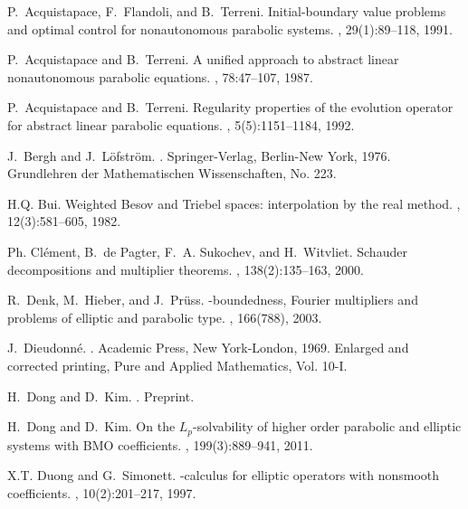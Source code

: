 \documentclass{amsart}
\theoremstyle{plain}
\theoremstyle{remark}
\theoremstyle{plain}
\numberwithin{equation}{section}
\begin{document}
\begin{thebibliography}{10}

P.~Acquistapace, F.~Flandoli, and B.~Terreni.
\newblock Initial-boundary value problems and optimal control for nonautonomous
  parabolic systems.
, 29(1):89--118, 1991.

P.~Acquistapace and B.~Terreni.
\newblock A unified approach to abstract linear nonautonomous parabolic
  equations.
, 78:47--107, 1987.

P.~Acquistapace and B.~Terreni.
\newblock Regularity properties of the evolution operator for abstract linear
  parabolic equations.
, 5(5):1151--1184, 1992.

J.~Bergh and J.~L{\"o}fstr{\"o}m.
.
\newblock Springer-Verlag, Berlin-New York, 1976.
\newblock Grundlehren der Mathematischen Wissenschaften, No. 223.

H.Q. Bui.
\newblock Weighted {B}esov and {T}riebel spaces: interpolation by the real
  method.
, 12(3):581--605, 1982.

Ph. Cl{\'e}ment, B.~de Pagter, F.~A. Sukochev, and H.~Witvliet.
\newblock Schauder decompositions and multiplier theorems.
, 138(2):135--163, 2000.

R.~Denk, M.~Hieber, and J.~Pr{\"u}ss.
-boundedness, {F}ourier multipliers and problems of elliptic and
  parabolic type.
, 166(788), 2003.

J.~Dieudonn{\'e}.
.
\newblock Academic Press, New York-London, 1969.
\newblock Enlarged and corrected printing, Pure and Applied Mathematics, Vol.
  10-I.

H.~Dong and D.~Kim.
.
\newblock Preprint.

H.~Dong and D.~Kim.
\newblock On the {$L_p$}-solvability of higher order parabolic and elliptic
  systems with {BMO} coefficients.
, 199(3):889--941, 2011.

X.T. Duong and G.~Simonett.
-calculus for elliptic operators with nonsmooth
  coefficients.
, 10(2):201--217, 1997.


\end{thebibliography}
\end{document}
